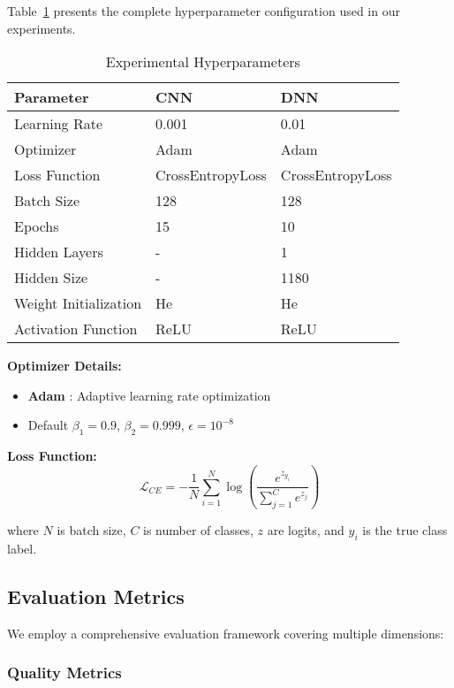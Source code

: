 \documentclass[runningheads]{llncs}
\begin{document}
Table~\ref{tab:hyperparameters} presents the complete hyperparameter configuration used in our experiments.

\begin{table}[htbp]
\centering
\caption{Experimental Hyperparameters}
\label{tab:hyperparameters}
\begin{tabular}{lll}
\toprule
\textbf{Parameter} & \textbf{CNN} & \textbf{DNN} \\
\midrule
Learning Rate & 0.001 & 0.01 \\
Optimizer & Adam & Adam \\
Loss Function & CrossEntropyLoss & CrossEntropyLoss \\
Batch Size & 128 & 128 \\
Epochs & 15 & 10 \\
Hidden Layers & - & 1 \\
Hidden Size & - & 1180 \\
Weight Initialization & He & He \\
Activation Function & ReLU & ReLU \\
\bottomrule
\end{tabular}
\end{table}

\textbf{Optimizer Details:}
\begin{itemize}
    \item \textbf{Adam} \cite{kingma2014adam}: Adaptive learning rate optimization
    \item Default $\beta_1 = 0.9$, $\beta_2 = 0.999$, $\epsilon = 10^{-8}$
\end{itemize}

\textbf{Loss Function:}
\begin{equation}
\mathcal{L}_{CE} = -\frac{1}{N}\sum_{i=1}^{N}\log\left(\frac{e^{z_{y_i}}}{\sum_{j=1}^{C}e^{z_j}}\right)
\end{equation}

where $N$ is batch size, $C$ is number of classes, $z$ are logits, and $y_i$ is the true class label.

\subsection{Evaluation Metrics}

We employ a comprehensive evaluation framework covering multiple dimensions:

\subsubsection{Quality Metrics}
\end{document}
